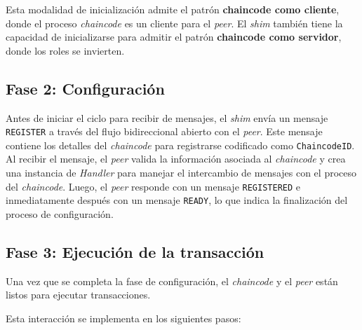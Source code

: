 Esta modalidad de inicialización admite el patrón \textbf{chaincode como  cliente}, donde el proceso \textit{chaincode} es un cliente para el \textit{peer}. El \textit{shim} también tiene la capacidad de inicializarse para admitir el patrón \textbf{chaincode como servidor}, donde los roles se invierten.

\subsection*{Fase 2: Configuración}
Antes de iniciar el ciclo para recibir de mensajes, el \textit{shim} envía un mensaje \texttt{REGISTER} a través del flujo bidireccional abierto con el \textit{peer}. Este mensaje contiene los detalles del \textit{chaincode} para registrarse codificado como \texttt{ChaincodeID}.
Al recibir el mensaje, el \textit{peer} valida la información asociada al \textit{chaincode} y crea una instancia de \textit{Handler} para manejar el intercambio de mensajes con el proceso del \textit{chaincode}. Luego, el \textit{peer} responde con un mensaje \texttt{REGISTERED} e inmediatamente después con un mensaje \texttt{READY}, lo que indica la finalización del proceso de configuración.

\subsection*{Fase 3: Ejecución de la transacción}
Una vez que se completa la fase de configuración, el \textit{chaincode} y el \textit{peer} están listos para ejecutar transacciones.


Esta interacción se implementa en los siguientes pasos:

